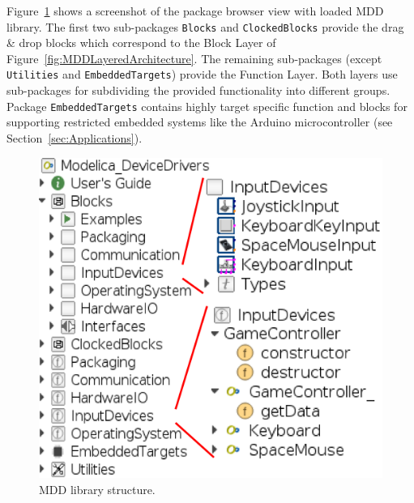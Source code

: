 \documentclass{resources/modelica}
\newcommand{\modelica}[1]{\lstinline[language=modelica]|#1|}
\begin{document}
Figure~\ref{fig:MDDPackageBrowseScreenshot} shows a screenshot of the package
browser view with loaded MDD library. The first two sub-packages
\modelica{Blocks} and \modelica{ClockedBlocks} provide the drag \& drop blocks
which correspond to the \textsf{Block Layer} of
Figure~\ref{fig:MDDLayeredArchitecture}. The remaining sub-packages (except
\modelica{Utilities} and \modelica{EmbeddedTargets}) provide the
\textsf{Function Layer}.
Both layers use sub-packages for subdividing the provided functionality into
different groups. Package \modelica{EmbeddedTargets} contains highly
target specific function and blocks for supporting restricted
embedded systems like the Arduino microcontroller (see
Section~\ref{sec:Applications}).

\begin{figure}[htb]
  \centering
  \includegraphics[width=\columnwidth]{figures/MDDPackageBrowseScreenshot}
  \caption{MDD library structure.}
  \label{fig:MDDPackageBrowseScreenshot}
\end{figure}
\end{document}
